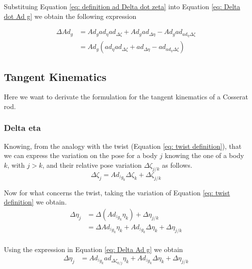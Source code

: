 \documentclass[12pt,a4paper]{book}
\begin{document}
Substituing Equation \eqref{eq: definition ad Delta dot zeta} into Equation \eqref{eq: Delta dot Ad g} we obtain the following expression

\begin{equation}\label{eq: Delta dot Ad g final}
\begin{aligned}
	\Delta Ad_g 	&= Ad_g ad_\eta ad_{\Delta \zeta} + Ad_g ad_{\Delta \eta} - Ad_g ad_{ad_\eta \Delta \zeta} \\
					&= Ad_g \left( ad_\eta ad_{\Delta \zeta} +  ad_{\Delta \eta} -  ad_{ad_\eta \Delta \zeta} \right)
\end{aligned}
\end{equation}



\subsection{Tangent Kinematics}

Here we want to derivate the formulation for the tangent kinematics of a Cosserat rod.

\subsubsection{Delta eta}

Knowing, from the analogy with the twist (Equation \eqref{eq: twist definition}), that we can express the variation on the pose for a body $j$ knowing the one of a body $k$, with $j>k$, and their relative pose variation $\Delta \zeta_{j/k}$ as follows.
\begin{equation}
	\Delta \zeta _ j = Ad_{^j g _k} \Delta \zeta _k + \Delta \zeta _ {j/k}
\end{equation}


Now for what concerns the twist, taking the variation of Equation \eqref{eq: twist definition} we obtain.
\begin{equation}
\begin{aligned}
	\Delta \eta_j 	&= \Delta \left( Ad_{^j g_k} \eta_k \right) + \Delta \eta_{j/k} \\
					&= \Delta  Ad_{^j g_k} \eta_k + Ad_{^j g_k} \Delta \eta_k  + \Delta \eta_{j/k} \\
\end{aligned}
\end{equation}

Using the expression in Equation \eqref{eq: Delta Ad g} we obtain 
\begin{equation}\label{eq: delta eta 1}
\begin{aligned}
	\Delta \eta_j 	&= Ad_{^j g_k} ad_{\Delta \zeta_{k/j}} \eta_k + Ad_{^j g_k} \Delta \eta_k  + \Delta \eta_{j/k} \\
\end{aligned}
\end{equation}
\end{document}
